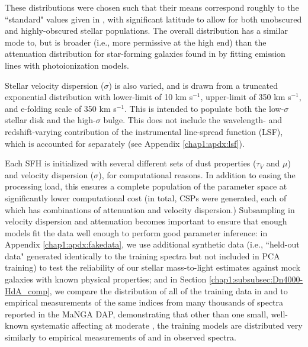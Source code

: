 These distributions were chosen such that their means correspond roughly to the ``standard" values given in \citet{charlot_fall_00}, with significant latitude to allow for both unobscured and highly-obscured stellar populations. The overall distribution has a similar mode to, but is broader (i.e., more permissive at the high end) than the attenuation distribution for star-forming galaxies found in \citet{brinchmann_04_mpajhu} by fitting emission lines with photoionization models.

Stellar velocity dispersion ($\sigma$) is also varied, and is drawn from a truncated exponential distribution with lower-limit of 10 km s$^{-1}$, upper-limit of 350 km s$^{-1}$, and e-folding scale of 350 km s$^{-1}$. This is intended to populate both the low-$\sigma$ stellar disk and the high-$\sigma$ bulge. This does not include the wavelength- and redshift-varying contribution of the instrumental line-spread function (LSF), which is accounted for separately (see Appendix \ref{chap1:apdx:lsf}).

Each SFH is initialized with several different sets of dust properties ($\tau_V$ and $\mu$) and velocity dispersion ($\sigma$), for computational reasons. In addition to easing the processing load, this ensures a complete population of the parameter space at significantly lower computational cost (in total, \nSFHs CSPs were generated, each of which has \nsubsample combinations of attenuation and velocity dispersion.) Subsampling in velocity dispersion and attenuation becomes important to ensure that enough models fit the data well enough to perform good parameter inference: in Appendix \ref{chap1:apdx:fakedata}, we use additional synthetic data (i.e., ``held-out data" generated identically to the training spectra but not included in PCA training) to test the reliability of our stellar mass-to-light estimates against mock galaxies with known physical properties; and in Section \ref{chap1:subsubsec:Dn4000-HdA_comp}, we compare the distribution of all of the training data in \Dn and \HdeltaA to empirical measurements of the same indices from many thousands of spectra reported in the MaNGA DAP, demonstrating that other than one small, well-known systematic affecting \HdeltaA at moderate \Dn, the training models are distributed very similarly to empirical measurements of \Dn and \HdeltaA in observed spectra.

